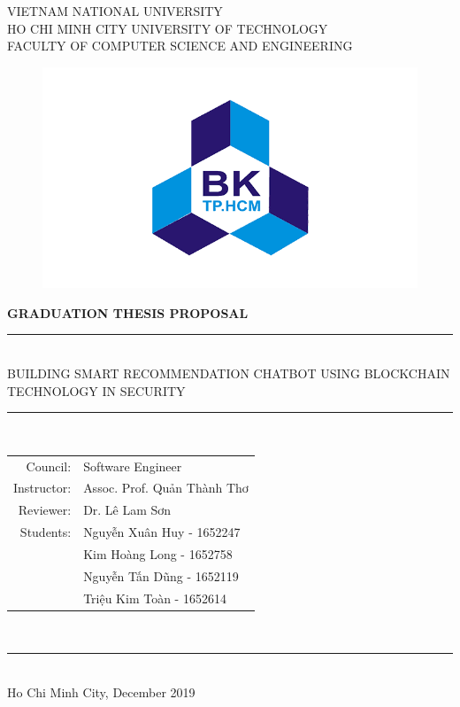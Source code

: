\documentclass[a4paper,12pt,oneside]{report}
\begin{document}
\begin{titlepage}

\newcommand{\HRule}{\rule{\linewidth}{0.5mm}}
\centering

\large VIETNAM NATIONAL UNIVERSITY\\ 
HO CHI MINH CITY UNIVERSITY OF TECHNOLOGY \\
FACULTY OF COMPUTER SCIENCE AND ENGINEERING \\ 

\begin{figure}[!ht]
    \centering
    \includegraphics[scale=0.3]{Picture/logo.png}
    \label{fig:logo}
\end{figure}

\bfseries
\Large{GRADUATION THESIS PROPOSAL} \\
\HRule \\ [0.5cm]
\Large{BUILDING SMART RECOMMENDATION CHATBOT USING BLOCKCHAIN TECHNOLOGY IN SECURITY}
\HRule \\ [2cm]

\normalfont
\normalsize
\begin{tabular}{r l}
    Council: & Software Engineer\\
    Instructor: & Assoc. Prof. Quản Thành Thơ  \\
    Reviewer: & Dr. Lê Lam Sơn \\
    Students: & Nguyễn Xuân Huy - 1652247 \\
    & Kim Hoàng Long - 1652758 \\
    & Nguyễn Tấn Dũng - 1652119 \\
    & Triệu Kim Toàn - 1652614 \\
\end{tabular} 
\\ [1.2cm]
\HRule \\
Ho Chi Minh City, December 2019
\end{titlepage}
\end{document}
